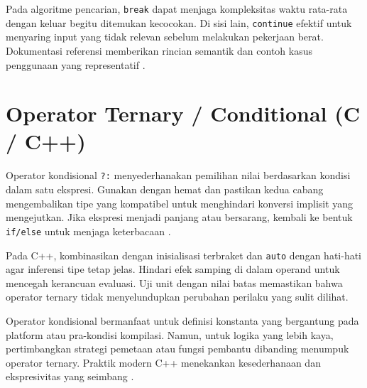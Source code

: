 \documentclass[../main.tex]{subfiles}
\begin{document}
Pada algoritme pencarian, \texttt{break} dapat menjaga kompleksitas waktu rata-rata dengan keluar begitu ditemukan kecocokan. Di sisi lain, \texttt{continue} efektif untuk menyaring input yang tidak relevan sebelum melakukan pekerjaan berat. Dokumentasi referensi memberikan rincian semantik dan contoh kasus penggunaan yang representatif \parencite{gnu-c-manual,cpp-reference}.

\section{Operator Ternary / Conditional (C / C++)}
Operator kondisional \texttt{?:} menyederhanakan pemilihan nilai berdasarkan kondisi dalam satu ekspresi. Gunakan dengan hemat dan pastikan kedua cabang mengembalikan tipe yang kompatibel untuk menghindari konversi implisit yang mengejutkan. Jika ekspresi menjadi panjang atau bersarang, kembali ke bentuk \texttt{if/else} untuk menjaga keterbacaan \parencite{cpp-reference}.

Pada C++, kombinasikan dengan inisialisasi terbraket dan \texttt{auto} dengan hati-hati agar inferensi tipe tetap jelas. Hindari efek samping di dalam operand untuk mencegah kerancuan evaluasi. Uji unit dengan nilai batas memastikan bahwa operator ternary tidak menyelundupkan perubahan perilaku yang sulit dilihat.

Operator kondisional bermanfaat untuk definisi konstanta yang bergantung pada platform atau pra-kondisi kompilasi. Namun, untuk logika yang lebih kaya, pertimbangkan strategi pemetaan atau fungsi pembantu dibanding menumpuk operator ternary. Praktik modern C++ menekankan kesederhanaan dan ekspresivitas yang seimbang \parencite{cpp-reference}.
\end{document}
